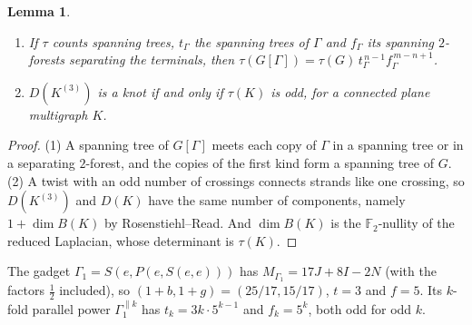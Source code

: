 \documentclass[11pt]{article}
\newtheorem{lemma}[theorem]{Lemma}
\theoremstyle{definition}
\theoremstyle{remark}
\newcommand{\F}{\mathbb{F}}
\begin{document}
\begin{lemma}\label{lem:knot}
\begin{enumerate}
\item If $\tau$ counts spanning trees, $t_\Gamma$ the spanning trees of $\Gamma$
and $f_\Gamma$ its spanning $2$-forests separating the terminals, then
$\tau(G[\Gamma])=\tau(G)\,t_\Gamma^{\,n-1}f_\Gamma^{\,m-n+1}$.
\item $D(K^{(3)})$ is a knot if and only if $\tau(K)$ is odd, for a connected
plane multigraph $K$.
\end{enumerate}
\end{lemma}

\begin{proof}
(1) A spanning tree of $G[\Gamma]$ meets each copy of $\Gamma$ in a spanning
tree or in a separating $2$-forest, and the copies of the first kind form a
spanning tree of $G$. (2) A twist with an odd number of crossings connects
strands like one crossing, so $D(K^{(3)})$ and $D(K)$ have the same number of
components, namely $1+\dim B(K)$ by Rosenstiehl--Read. And $\dim B(K)$ is the
$\F_2$-nullity of the reduced Laplacian, whose determinant is $\tau(K)$.
\end{proof}

The gadget $\Gamma_1=S(e,P(e,S(e,e)))$ has
$M_{\Gamma_1}=17J+8I-2N$ (with the factors $\tfrac12$ included), so
$(1+b,1+g)=(25/17,15/17)$, $t=3$ and $f=5$. Its $k$-fold parallel power
$\Gamma_1^{\parallel k}$ has $t_k=3k\cdot5^{k-1}$ and $f_k=5^k$, both odd for odd $k$.
\end{document}
